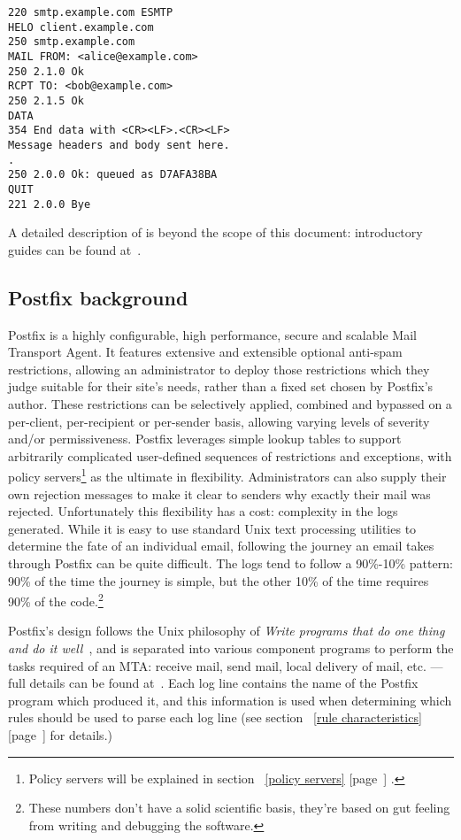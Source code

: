 \documentclass[a4paper,12pt,draft]{article}
\newcommand{\refwithpage}[1]{%
    \empty{}\ref{#1} [page~\pageref{#1}]%
}
\begin{document}
\begin{verbatim}
220 smtp.example.com ESMTP
HELO client.example.com
250 smtp.example.com
MAIL FROM: <alice@example.com>
250 2.1.0 Ok
RCPT TO: <bob@example.com>
250 2.1.5 Ok
DATA
354 End data with <CR><LF>.<CR><LF>
Message headers and body sent here.
.
250 2.0.0 Ok: queued as D7AFA38BA
QUIT
221 2.0.0 Bye
\end{verbatim}

A detailed description of \SMTP{} is beyond the scope of this document:
introductory guides can be found at~\cite{smtp-intro-01, smtp-intro-02}.

\subsection{Postfix background}

Postfix is a highly configurable, high performance, secure and scalable
Mail Transport Agent.  It features extensive and extensible optional
anti-spam restrictions, allowing an administrator to deploy those
restrictions which they judge suitable for their site's needs, rather than
a fixed set chosen by Postfix's author.  These restrictions can be
selectively applied, combined and bypassed on a per-client, per-recipient
or per-sender basis, allowing varying levels of severity and/or
permissiveness.  Postfix leverages simple lookup tables to support
arbitrarily complicated user-defined sequences of restrictions and
exceptions, with policy servers\footnote{Policy servers will be explained
in section~\refwithpage{policy servers}.} as the ultimate in flexibility.
Administrators can also supply their own rejection messages to make it
clear to senders why exactly their mail was rejected.  Unfortunately this
flexibility has a cost: complexity in the logs generated.  While it is easy
to use standard Unix text processing utilities to determine the fate of an
individual email, following the journey an email takes through Postfix can
be quite difficult.  The logs tend to follow a 90\%-10\% pattern: 90\% of
the time the journey is simple, but the other 10\% of the time requires
90\% of the code.\footnote{These numbers don't have a solid scientific
basis, they're based on gut feeling from writing and debugging the
software.}

Postfix's design follows the Unix philosophy of \textit{Write programs that
do one thing and do it well\/}~\cite{unix-philosophy}, and is separated
into various component programs to perform the tasks required of an MTA\@:
receive mail, send mail, local delivery of mail, etc. --- full details can
be found at~\cite{postfix-overview}.  Each log line contains the name of
the Postfix program which produced it, and this information is used when
determining which rules should be used to parse each log line (see
section~\refwithpage{rule characteristics} for details.)
\end{document}
